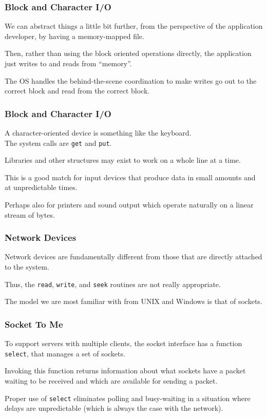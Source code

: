 \begin{frame}
\frametitle{Block and Character I/O}

We can abstract things a little bit further, from the perspective of the application developer, by having a memory-mapped file. 

Then, rather than using the block oriented operations directly, the application just writes to and reads from ``memory''.

The OS handles the behind-the-scene coordination to make writes go out to the correct block and read from the correct block.


\end{frame}

\begin{frame}
\frametitle{Block and Character I/O}

A character-oriented device is something like the keyboard.\\
\quad The system calls are \texttt{get} and \texttt{put}. 

Libraries and other structures may exist to work on a whole line at a time.

This is a good match for input devices that produce data in small amounts and at unpredictable times. 

Perhaps also for printers and sound output which operate naturally on a linear stream of bytes.

\end{frame}

\begin{frame}
\frametitle{Network Devices}

Network devices are fundamentally different from those that are directly attached to the system. 

Thus, the \texttt{read}, \texttt{write}, and \texttt{seek} routines are not really appropriate. 

The model we are most familiar with from UNIX and Windows is that of \alert{sockets}.


\end{frame}


\begin{frame}
\frametitle{Socket To Me}

To support servers with multiple clients, the socket interface has a function \texttt{select}, that manages a set of sockets. 

Invoking this function returns information about what sockets have a packet waiting to be received and which are available for sending a packet. 

Proper use of \texttt{select} eliminates polling and busy-waiting in a situation where delays are unpredictable (which is always the case with the network).


\end{frame}


